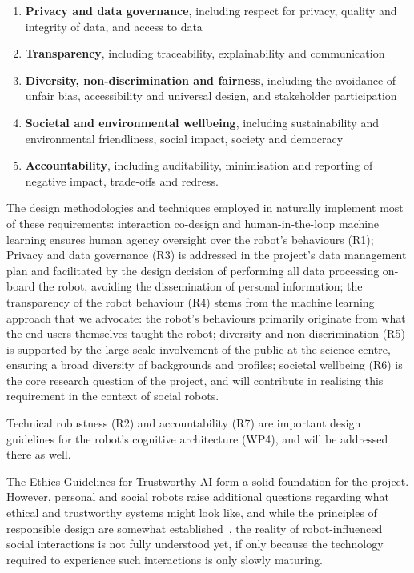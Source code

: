 \begin{rewrite}
\begin{enumerate}[label=\textbf{R\arabic*}]
    \item \textbf{Privacy and data governance}, including respect for privacy,
        quality and integrity of data, and access to data

    \item \textbf{Transparency}, including traceability, explainability and
        communication

    \item \textbf{Diversity, non-discrimination and fairness}, including the
        avoidance of unfair bias, accessibility and universal design, and
        stakeholder participation

    \item \textbf{Societal and environmental wellbeing}, including
        sustainability and environmental friendliness, social impact, society
        and democracy

    \item \textbf{Accountability}, including auditability, minimisation and
        reporting of negative impact, trade-offs and redress.

\end{enumerate}

The design methodologies and techniques employed in \project naturally implement
most of these requirements: interaction co-design and human-in-the-loop machine
learning ensures human agency oversight over the robot's behaviours (R1);
Privacy and data governance (R3) is addressed in the project's data management
plan and facilitated by the design decision of performing all data processing
on-board the robot, avoiding the dissemination of personal information; the
transparency of the robot behaviour (R4) stems from the machine learning
approach that we advocate: the robot's behaviours primarily originate from what
the end-users themselves taught the robot; diversity and non-discrimination (R5)
is supported by the large-scale involvement of the public at the science centre,
ensuring a broad diversity of backgrounds and profiles; societal wellbeing (R6)
is the core research question of the project, and \project will contribute in
realising this requirement in the context of social robots.

Technical robustness (R2) and accountability (R7) are important design
guidelines for the robot's cognitive architecture (WP4), and will be addressed
there as well.


The Ethics Guidelines for Trustworthy AI form a solid foundation for the
project. However, personal and social robots raise additional questions
regarding what ethical and trustworthy systems might look like, and while the
principles of responsible design are somewhat established~\cite{stahl2016ethics,
bsi2016robots}, the reality of robot-influenced social interactions is not
fully understood yet, if only because the technology required to experience such
interactions is only slowly maturing. 


\end{rewrite}
